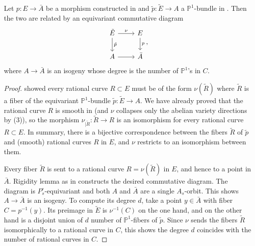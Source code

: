 \documentclass[reqno, letterpaper]{amsart}
\numberwithin{equation}{subsection}
\let\to\longrightarrow
\newcommand{\PP}{\mathbb{P}}
\begin{document}
		\begin{lemma} \label{lem:prop:E step 3}
			Let $p : E \to \bar A$ be a morphism constructed in  and $\tilde p : \tilde E \to A$ a $\PP^1$-bundle in . Then the two are related by an equivariant commutative diagram
			\[\begin{tikzcd}
				\tilde E \arrow[r, "\nu"] \arrow[d, "\tilde p"] & E \arrow[d, "p"] \\
				A \arrow[r] & \bar A
			\end{tikzcd},\]
			where $A \to \bar A$ is an isogeny whose degree is the number of $\PP^1$'s in $C$.
		\end{lemma}
		\begin{proof}
			 showed every rational curve $R \subset E$ must be of the form $\nu(\tilde R)$ where $\tilde R$ is a fiber of the equivariant $\PP^1$-bundle $\tilde p : \tilde E \to A$. We have already proved that the rational curve $R$ is smooth in  (and $\nu$ collapses only the abelian variety directions by (3)), so the morphism $\nu_{|\tilde R} : \tilde R \to R$ is an isomorphism for every rational curve $R \subset E$. In summary, there is a bijective correspondence between the fibers $\tilde R$ of $\tilde p$ and (smooth) rational curves $R$ in $E$, and $\nu$ restricts to an isomorphism between them.
			
			Every fiber $\tilde R$ is sent to a rational curve $R = \nu(\tilde R)$ in $E$, and hence to a point in $\bar A$. Rigidity lemma as in \cite[Lemma~14]{kaw81} constructs the desired commutative diagram. The diagram is $P^\circ_s$-equivariant and both $A$ and $\bar A$ are a single $A_s$-orbit. This shows $A \to \bar A$ is an isogeny. To compute its degree $d$, take a point $y \in \bar A$ with fiber $C = p^{-1}(y)$. Its preimage in $\tilde E$ is $\nu^{-1}(C)$ on the one hand, and on the other hand is a disjoint union of $d$ number of $\PP^1$-fibers of $\tilde p$. Since $\nu$ sends the fibers $\tilde R$ isomorphically to a rational curve in $C$, this shows the degree $d$ coincides with the number of rational curves in $C$.
		\end{proof}
		
\end{document}
